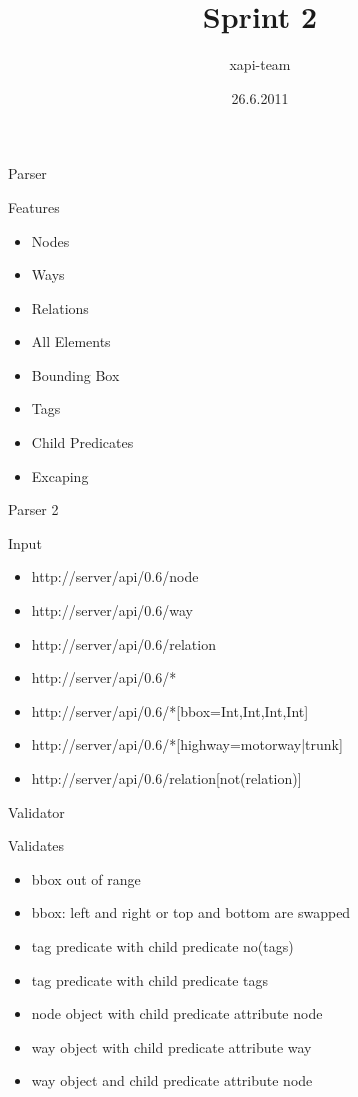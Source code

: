 \documentclass{beamer}
\title{Sprint 2}
\author{xapi-team}
\institute{Institute for Computer Science, Free University Berlin}
\date{26.6.2011}
\begin{document}
\begin{frame}
\titlepage
\end{frame}

\begin{frame}{Parser}
    \begin{block}{Features}
        \begin{itemize}
            \item Nodes
            \item Ways
            \item Relations
            \item All Elements
            \item Bounding Box
            \item Tags
            \item Child Predicates
            \item Excaping
        \end{itemize}
    \end{block}
\end{frame}

\begin{frame}{Parser 2}
    \begin{block}{Input}
        \begin{itemize}
            \item http://server/api/0.6/node
            \item http://server/api/0.6/way
            \item http://server/api/0.6/relation
            \item http://server/api/0.6/*
            \item http://server/api/0.6/*[bbox=Int,Int,Int,Int]
            \item http://server/api/0.6/*[highway=motorway|trunk]
            \item http://server/api/0.6/relation[not(relation)]
        \end{itemize}
    \end{block}
\end{frame}

\begin{frame}{Validator}

    \begin{block}{Validates}
        \begin{itemize}
            \item bbox out of range
            \item bbox: left and right or top and bottom are swapped
            \item tag predicate with child predicate no(tags)
            \item tag predicate with child predicate tags
            \item node object with child predicate attribute node
            \item way object with child predicate attribute way
            \item way object and child predicate attribute node
        \end{itemize}
    \end{block}

\end{frame}
\end{document}

